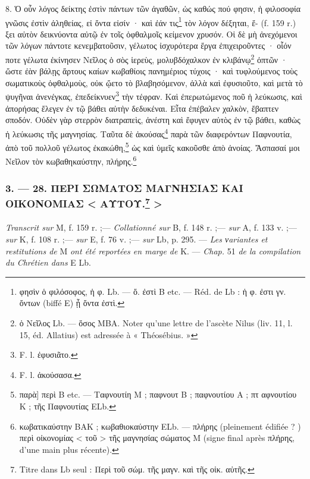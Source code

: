 \documentclass[a4paper, 11pt, oneside, polutonikogreek, french]{article}
\begin{document}
8. Ὁ οὖν λόγος δείκτης ἐστὶν πάντων τῶν ἀγαθῶν, ὡς καθώς πού φησιν, ἡ φιλοσοφία γνῶσις ἐστὶν ἀληθείας, εἰ ὄντα εἰσίν · καὶ ἐάν τις\footnote{φησὶν ὁ φιλόσοφος, ἡ φ. Lb. --- ὄ. ἐστὶ B etc. --- Réd. de Lb : ἡ φ. ἐστι γν. ὄντων (biffé E) ᾗ ὄντα ἐστὶ.} τὸν λόγον δέξηται, ἕ- (f. 159 r.) ξει αὐτὸν δεικνύοντα αὐτῷ ἐν τοῖς ὀφθαλμοῖς κείμενον χρυσόν. Οἱ δὲ μὴ ἀνεχόμενοι τῶν λόγων πάντοτε κενεμβατοῦσιν, γέλωτος ἰσχυρότερα ἔργα ἐπιχειροῦντες · οἷόν ποτε γέλωτα ἐκίνησεν Νεῖλος ὁ σὸς ἱερεὺς, μολυβδόχαλκον ἐν κλιβάνῳ\footnote{ὁ Nεῖλος Lb. --- ὅσος MBA. Noter qu'une lettre de l'ascète Nilus (liv. 11, l. 15, éd. Allatius) est adressée à « Théosébius. »} ὀπτῶν · ὥστε ἐὰν βάλῃς ἄρτους καίων κωβαθίοις πανημέριος τύχοις · καὶ τυφλούμενος τοὺς σωματικοὺς ὀφθαλμοὺς, οὐκ ᾤετο τὸ βλαβησόμενον, ἀλλὰ καὶ ἐφυσιοῦτο, καὶ μετὰ τὸ ψυγῆναι ἀνενέγκας, ἐπεδείκνυεν\footnote{F. l. ἐφυσιᾶτο.} τὴν τέφραν. Καὶ ἐπερωτώμενος ποῦ ἡ λεύκωσις, καὶ ἀπορήσας ἔλεγεν ἐν τῷ βάθει αὐτὴν δεδυκέναι. Εἶτα ἐπέβαλεν χαλκὸν, ἔβαπτεν σποδόν. Οὐδὲν γὰρ στερρὸν διατραπεὶς, ἀνέστη καὶ ἔφυγεν αὐτὸς ἐν τῷ βάθει, καθὼς ἡ λεύκωσις τῆς μαγνησίας. Ταῦτα δὲ ἀκούσας\footnote{F. l. ἀκούσασα.} παρὰ τῶν διαφερόντων Παφνουτία, ἀπὸ τοῦ πολλοῦ γέλωτος ἐκακώθη,\footnote{παρὰ] περὶ B etc. --- Tαφνουτίη M ; παφνουτ B ; παφνουτίου A ; πτ αφνουτίου K ; τῆς Παφνουτίας ELb.} ὡς καὶ ὑμεῖς κακοῦσθε ἀπὸ ἀνοίας. Ἄσπασαί μοι Νεῖλον τὸν κωβαθηκαύστην, πλήρης.\footnote{κωβατικαύστην BAK ; κωβαθιοκαύστην ELb. --- πλήρης (pleinement édifiée ? ) περὶ οἰκονομίας < τοῦ > τῆς μαγνησίας σώματος M (signe final après πλήρης, d'une main plus récente).}

\bigskip
\centerline{\EightStarTaper}
\centerline{\EightStarTaper\EightStarTaper}
\bigskip

\subsubsection[3. --- 28. ΠΕΡΙ ΣΩΜΑΤΟΣ ΜΑΓΝΗΣΙΑΣ ΚΑΙ ΟΙΚΟΝΟΜΙΑΣ < ΑΥΤΟΥ. >]{3. --- 28. ΠΕΡΙ ΣΩΜΑΤΟΣ ΜΑΓΝΗΣΙΑΣ ΚΑΙ ΟΙΚΟΝΟΜΙΑΣ < ΑΥΤΟΥ.\footnote{Titre dans Lb seul : Περὶ τοῦ σώμ. τῆς μαγν. καὶ τῆς οἰκ. αὐτῆς.} >}
\paragraph{}
\emph{Transcrit sur} M, f. 159 r. ;--- \emph{Collationné sur} B, f. 148 r. ;--- \emph{sur} A, f. 133 v. ;--- \emph{sur} K, f. 108 r. ;--- \emph{sur} E, f. 76 v. ;--- \emph{sur} Lb, p. 295. --- \emph{Les νariantes et restitutions de} M \emph{ont été reportées en marge de} K. --- \emph{Chap.} 51 \emph{de la compilation du Chrétien dans} E Lb.
\end{document}
